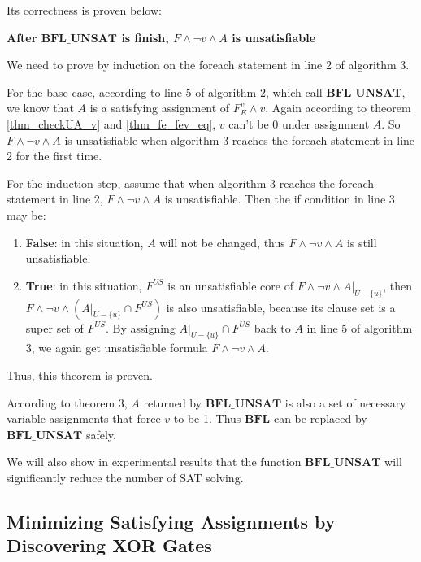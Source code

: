 \documentclass[journal]{IEEEtran}
\begin{document}
Its correctness is proven below:
\vspace{0.2cm}
\begin{theorem}[]\label{thm_BFL_UNSAT}
\textbf{After $\boldsymbol{BFL\_UNSAT}$ is finish, $F\wedge\neg v\wedge A$ is unsatisfiable}
\end{theorem}
\begin{IEEEproof}
We need to prove by induction on the foreach statement in line 2 of algorithm 3.

For the base case,
according to line 5 of algorithm 2,
which call $\boldsymbol{BFL\_UNSAT}$,
we know that $A$ is a satisfying assignment of $F_E^v\wedge v$.
Again according to theorem \ref{thm_checkUA_v} and \ref{thm_fe_fev_eq},
$v$ can't be 0 under assignment $A$.
So $F\wedge\neg v\wedge A$ is unsatisfiable
when algorithm 3 reaches the foreach statement in line 2 for the first time.

For the induction step,
assume that when algorithm 3 reaches the foreach statement in line 2,
$F\wedge\neg v\wedge A$ is unsatisfiable.
Then the if condition in line 3 may be:
\begin{enumerate}
\item \textbf{False}: in this situation,
$A$ will not be changed,
thus $F\wedge\neg v\wedge A$ is still unsatisfiable.

\item \textbf{True}: in this situation,
$F^{US}$ is an unsatisfiable core of $F\wedge\neg v\wedge A|_{U-\{u\}}$,
then $F\wedge\neg v\wedge (A|_{U-\{u\}}\cap F^{US})$ is also unsatisfiable,
because its clause set is a super set of $F^{US}$.
By assigning $A|_{U-\{u\}}\cap F^{US}$ back to $A$ in line 5 of algorithm 3,
we again get unsatisfiable formula $F\wedge\neg v\wedge A$.
\end{enumerate}

Thus, this theorem is proven.
\end{IEEEproof}

According to theorem 3,
$A$ returned by $\boldsymbol{BFL\_UNSAT}$ is also a set of necessary variable assignments that force $v$ to be 1.
Thus $\boldsymbol{BFL}$ can be replaced by $\boldsymbol{BFL\_UNSAT}$ safely.

We will also show in experimental results that
the function $\boldsymbol{BFL\_UNSAT}$ will significantly reduce the number of SAT solving.

\subsection{Minimizing Satisfying Assignments by Discovering XOR Gates}\label{subsec_XOR}
\end{document}
